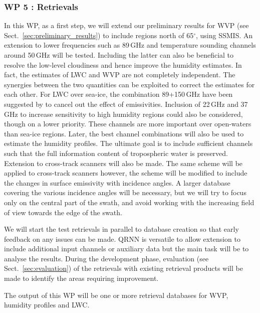 \documentclass[12pt,oneside,a4paper]{article}
\begin{document}
\subsubsection*{WP 5 : Retrievals}
%
\label{sec:retrievals}
%
In this WP, as a first step, we will extend our preliminary results for WVP (see Sect.~\ref{sec:preliminary_results}) to include regions north of 65$^\circ$, using SSMIS. An extension to lower frequencies such as  89\,GHz and temperature sounding channels around 50\,GHz will be tested. Including the latter can also be beneficial to resolve the low-level cloudiness and hence improve the humidity estimates. In fact, the estimates of LWC and WVP are not completely independent. The synergies between the two quantities can be exploited to correct the estimates for each other. For LWC over sea-ice, the combination 89+150\,GHz have been suggested by \citet{laue:2007:poten} to cancel out the effect of emissivities. Inclusion of 22\,GHz and 37\,GHz to increase sensitivity to high humidity regions could also be considered, though on a lower priority. These channels are more important over open-waters than sea-ice regions. Later, the best channel combinations will also be used to estimate the humidity profiles. The ultimate goal is to include sufficient channels such that the full information content of tropospheric water is preserved. Extension to cross-track scanners will also be made. The same scheme will be applied to cross-track scanners however, the scheme will be modified to include the changes in surface emissivity with incidence angles. A larger database covering the various incidence angles will be necessary, but we will try to focus only on the central part of the swath, and avoid working with the increasing field of view towards the edge of the swath. 

We will start the test retrievals in parallel to database creation so that early feedback on any issues can be made. QRNN is versatile to allow extension to include additional input channels or auxiliary data but the main task will be to analyse the results. During the development phase, evaluation (see Sect.~\ref{sec:evaluation}) of the retrievals with existing retrieval products will be made to identify the areas requiring improvement.

The output of this WP will be one or more retrieval databases for WVP, humidity profiles and LWC.
\vspace{-1.0ex}
\end{document}
